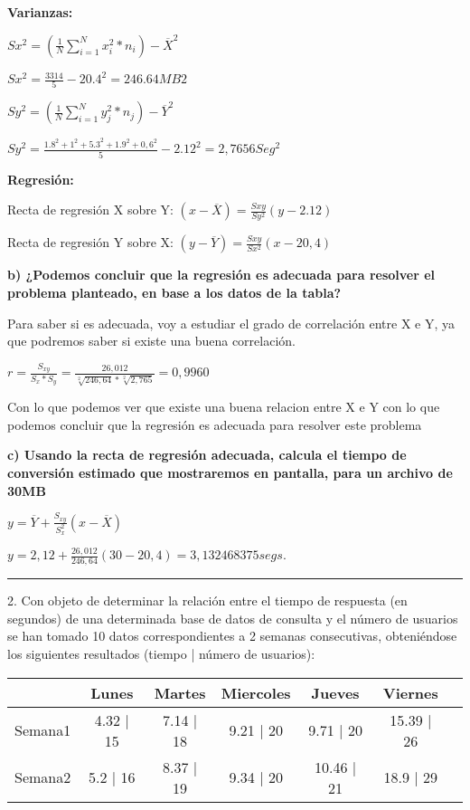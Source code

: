 \documentclass{article}
\begin{document}
\textbf{Varianzas:}

\(Sx^{2} = (\frac{1}{N} \displaystyle\sum_{i=1}^{N} x_{i}^{2} * n_{i}) - \overline{X}^{2} \)

\(Sx^ {2} = \frac{3314}{5}  - 20.4^{2} = 246.64 MB{2}\)

\(Sy^{2} = (\frac{1}{N} \displaystyle\sum_{i=1}^{N} y_{j}^{2} * n_{j}) - \overline{Y}^{2} \)

\(Sy^ {2} = \frac{1.8^{2} + 1^{2} + 5.3^{2} + 1.9^{2} + 0,6^{2}}{5}  - 2.12^{2} = 2,7656  Seg^{2}\)

\textbf{Regresi\'on: }

Recta de regresi\'on X sobre Y:
\((x - \overline{X}) = \frac{Sxy}{Sy^{2}} (y - 2.12)\)

Recta de regresi\'on Y sobre X:
\((y - \overline{Y}) = \frac{Sxy}{Sx^{2}} (x - 20,4) \)


\textbf{b) ¿Podemos concluir que la regresi\'on es adecuada para resolver el problema planteado, en base a los datos de la tabla? }

Para saber si es adecuada, voy a estudiar el grado de correlaci\'on entre X e Y, ya que podremos saber si existe una buena correlaci\'on.

\( r =  \frac{S_{xy}}{S_{x} * S_{y}} = \frac{26,012}{\sqrt[2]{246,64} * \sqrt[2]{2,765}} = 0,9960\)

Con lo que podemos ver que existe una buena relacion entre X e Y con lo que podemos concluir que la regresi\'on es adecuada para resolver este problema

\textbf{c) Usando la recta de regresi\'on adecuada, calcula el tiempo de conversi\'on estimado que mostraremos en pantalla, para un archivo de 30MB}

\(y = \overline{Y}  + \frac{S_{xy}}{S_{x}^2} (x - \overline{X})\)

\(y = 2,12 + \frac{26,012}{246,64}(30 - 20,4) = 3,132468375 segs.\)

\rule{123mm}{0.5mm}

2. Con objeto de determinar la relaci\'on entre el tiempo de respuesta (en segundos) de una determinada base de datos de consulta y el n\'umero de usuarios se han tomado 10 datos correspondientes a 2 semanas consecutivas, obteni\'endose los siguientes resultados (tiempo | número de usuarios):

\begin{tabular}{|l|c|c|c|c|c|c}
        & Lunes & Martes & Miercoles & Jueves & Viernes\\
\hline
Semana1 & 4.32 | 15 & 7.14 | 18 & 9.21 | 20 & 9.71 | 20 & 15.39 | 26\\
\hline
Semana2 & 5.2 | 16 & 8.37 | 19 & 9.34 | 20 & 10.46 | 21 & 18.9 | 29\\
\end{tabular}
\end{document}
